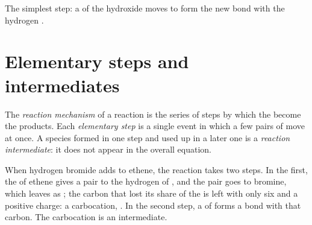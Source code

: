 \begin{omfigure}
\qquad\raisebox{0.2ex}{$+$}\qquad
{}
\qquad\raisebox{0.2ex}{$\longrightarrow$}\qquad
{}

{\small The simplest step: a  of the hydroxide  moves to form
the new  bond with the hydrogen .}
\end{omfigure}

\section{Elementary steps and intermediates}

\begin{definition}\label{def:g12:curly-arrows:mechanism}
The \emph{reaction mechanism} of a reaction is
the series of steps by which the  become the products. Each
\emph{elementary step} is a single event in which
a few pairs of  move at once. A species formed in one step and
used up in a later one is a \emph{reaction intermediate}:
it does not appear in the overall equation.
\end{definition}


\begin{example}\label{ex:g12:curly-arrows:carbocation}
When hydrogen bromide adds to ethene, the reaction takes two steps. In
the first, the  of ethene gives a pair to the hydrogen of
, and the  pair goes to bromine, which leaves as
; the carbon that lost its share of the  is left with
only six  and a positive charge: a carbocation,
. In the second step, a  of  forms a bond
with that carbon. The carbocation is an intermediate.
\end{example}

